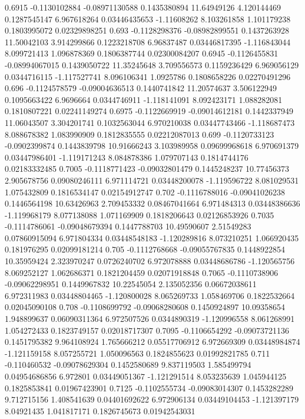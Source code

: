 {0.6915 -0.1130102884 -0.08971130588 0.1435380894 11.64949126 4.120144469 0.1287545147 6.967618264 0.03446435653 -1.11608262 8.103261858 1.101179238 0.1803995072 0.02329898251
0.693 -0.1128298376 -0.08982899551 0.1437263928 11.50042103 3.914299866 0.1223218708 6.96837487 0.03446817395 -1.116843044 8.099721413 1.096878369 0.1806387744 0.02300084207
0.6945 -0.1126455831 -0.08994067015 0.1439050722 11.35245648 3.709556573 0.1159236429 6.969056129 0.0344716115 -1.117527741 8.096106341 1.0925786 0.1808658226 0.02270491296
0.696 -0.1124578579 -0.09004636513 0.1440741842 11.20574637 3.506122949 0.1095663422 6.9696664 0.0344746911 -1.118141091 8.092423171 1.088282081 0.1810807221 0.02241149274
0.6975 -0.1122669919 -0.09014612181 0.1442337949 11.06043507 3.304201741 0.1032563044 6.970210038 0.03447743466 -1.118687473 8.088678382 1.083990909 0.1812835555 0.02212087013
0.699 -0.1120733123 -0.0902399874 0.1443839798 10.91666243 3.103989958 0.09699968618 6.970691379 0.03447986401 -1.119171243 8.084878386 1.079707143 0.1814744176 0.02183332485
0.7005 -0.1118771423 -0.09032801479 0.1445248237 10.77456373 2.905678756 0.09080246111 6.971114721 0.03448200078 -1.119596722 8.081029531 1.075432809 0.1816534147 0.02154912747
0.702 -0.1116788016 -0.09041026238 0.1446564198 10.63426963 2.709453332 0.08467041664 6.971484313 0.03448386636 -1.119968179 8.077138088 1.071169909 0.1818206643 0.02126853926
0.7035 -0.1114786061 -0.09048679394 0.1447788703 10.49590607 2.51549283 0.07860915094 6.971804334 0.03448548183 -1.120289816 8.073210251 1.066920435 0.181976295 0.02099181214
0.705 -0.1112768668 -0.09055767835 0.1448922854 10.35959424 2.323970247 0.0726240702 6.972078888 0.03448686786 -1.120565756 8.069252127 1.062686371 0.1821204459 0.02071918848
0.7065 -0.1110738906 -0.09062298951 0.1449967832 10.22545054 2.135052356 0.06672038611 6.972311983 0.03448804465 -1.120800028 8.065269733 1.058469706 0.1822532664 0.02045090108
0.708 -0.1108699792 -0.09068280608 0.1450924897 10.09358654 1.948899637 0.06090311364 6.972507526 0.0344890319 -1.120996558 8.061268991 1.054272433 0.1823749157 0.02018717307
0.7095 -0.1106654292 -0.09073721136 0.1451795382 9.964108924 1.765666212 0.05517706912 6.972669309 0.03448984874 -1.121159158 8.057255721 1.050096563 0.1824855623 0.01992821785
0.711 -0.110460532 -0.09078629304 0.1452580689 9.837119503 1.585499794 0.04954686856 6.972801 0.03449051367 -1.121291514 8.053235639 1.045944125 0.1825853841 0.01967423901
0.7125 -0.1102555734 -0.09083014307 0.1453282289 9.712715156 1.408541639 0.04401692622 6.972906134 0.03449104453 -1.121397179 8.04921435 1.041817171 0.1826745673 0.01942543031
}
